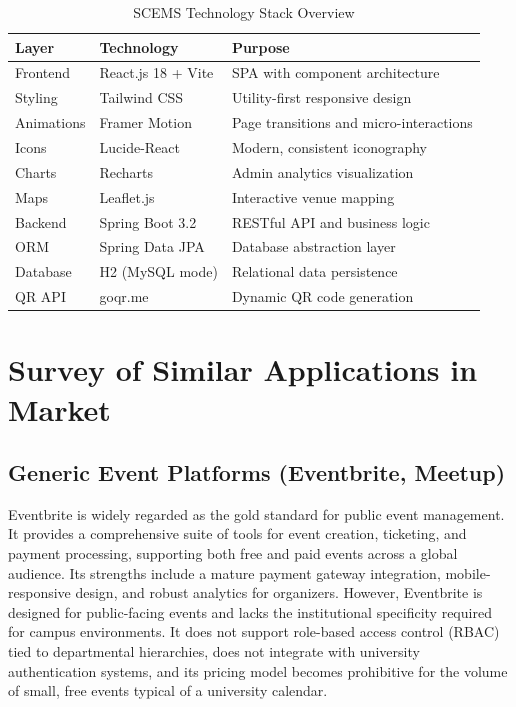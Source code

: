 \documentclass[12pt,a4paper]{report}
\begin{document}
\begin{table}[H]
\centering
\caption{SCEMS Technology Stack Overview}
\label{tab:tech_stack}
\begin{tabular}{|l|l|l|}
\hline
\textbf{Layer} & \textbf{Technology} & \textbf{Purpose} \\
\hline
Frontend & React.js 18 + Vite & SPA with component architecture \\
\hline
Styling & Tailwind CSS & Utility-first responsive design \\
\hline
Animations & Framer Motion & Page transitions and micro-interactions \\
\hline
Icons & Lucide-React & Modern, consistent iconography \\
\hline
Charts & Recharts & Admin analytics visualization \\
\hline
Maps & Leaflet.js & Interactive venue mapping \\
\hline
Backend & Spring Boot 3.2 & RESTful API and business logic \\
\hline
ORM & Spring Data JPA & Database abstraction layer \\
\hline
Database & H2 (MySQL mode) & Relational data persistence \\
\hline
QR API & goqr.me & Dynamic QR code generation \\
\hline
\end{tabular}
\end{table}

\chapter{Survey of Similar Applications in Market}

\section{Generic Event Platforms (Eventbrite, Meetup)}

Eventbrite is widely regarded as the gold standard for public event management. It provides a comprehensive suite of tools for event creation, ticketing, and payment processing, supporting both free and paid events across a global audience. Its strengths include a mature payment gateway integration, mobile-responsive design, and robust analytics for organizers. However, Eventbrite is designed for public-facing events and lacks the institutional specificity required for campus environments. It does not support role-based access control (RBAC) tied to departmental hierarchies, does not integrate with university authentication systems, and its pricing model becomes prohibitive for the volume of small, free events typical of a university calendar.
\end{document}
